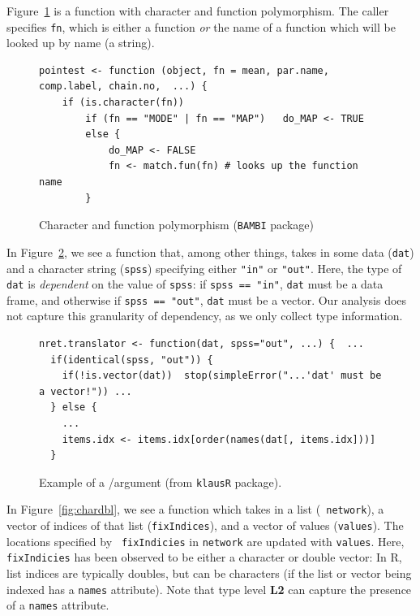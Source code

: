 \documentclass[acmsmall,10pt,review,anonymous]{acmart}\settopmatter{printfolios=true,printccs=false,printacmref=false}
\begin{document}
Figure~\ref{fig:charclos} is a function with character and function
polymorphism.  The caller specifies {\tt fn}, which is either a function
{\it or} the name of a function which will be looked up by name (a string).


\begin{figure}[!hb]{\small\begin{lstlisting}[style=R]
pointest <- function (object, fn = mean, par.name, comp.label, chain.no,  ...) {
    if (is.character(fn))
        if (fn == "MODE" | fn == "MAP")   do_MAP <- TRUE
        else {
            do_MAP <- FALSE
            fn <- match.fun(fn) # looks up the function name
        }
\end{lstlisting}}\caption{Character and function polymorphism ({\tt BAMBI} package)}\label{fig:charclos}\end{figure}

In Figure~\ref{fig:dfdbl}, we see a function that, among other things, takes
in some data ({\tt dat}) and a character string ({\tt spss}) specifying
either {\tt "in"} or {\tt "out"}.  Here, the type of {\tt dat} is {\it
  dependent} on the value of {\tt spss}: if {\tt spss == "in"}, {\tt dat}
must be a data frame, and otherwise if {\tt spss == "out"}, {\tt dat} must
be a vector.  Our analysis does not capture this granularity of dependency,
as we only collect type information.

\begin{figure}[!hb]{\small\begin{lstlisting}[style=R]
nret.translator <- function(dat, spss="out", ...) {  ...
  if(identical(spss, "out")) {
    if(!is.vector(dat))  stop(simpleError("...'dat' must be a vector!")) ...
  } else {
    ...
    items.idx <- items.idx[order(names(dat[, items.idx]))]
  }
\end{lstlisting}}\caption{Example of a \df/\D argument (from {\tt klausR} package).}\label{fig:dfdbl}\end{figure}

In Figure~\ref{fig:chardbl}, we see a function which takes in a list ({\tt
  network}), a vector of indices of that list ({\tt fixIndices}), and a
vector of values ({\tt values}).  The locations specified by {\tt
  fixIndicies} in {\tt network} are updated with {\tt values}.  Here, {\tt
  fixIndicies} has been observed to be either a character or double vector:
In R, list indices are typically doubles, but can be characters (if the list
or vector being indexed has a {\tt names} attribute).  Note that type level
{\bf L2} can capture the presence of a {\tt names} attribute.
\end{document}
